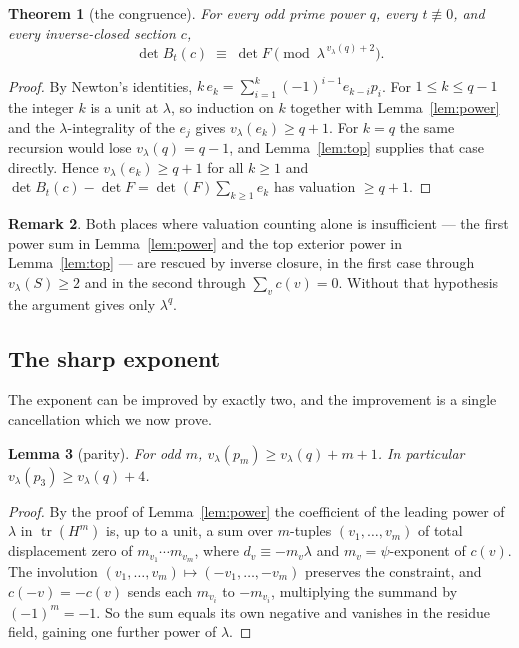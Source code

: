 \documentclass[11pt]{article}
\theoremstyle{plain}
\newtheorem{theorem}{Theorem}
\newtheorem{lemma}[theorem]{Lemma}
\theoremstyle{definition}
\newtheorem{remark}[theorem]{Remark}
\newcommand{\tr}{\operatorname{tr}}
\newcommand{\vlam}{v_\lambda}
\begin{document}
\begin{theorem}[the congruence]\label{thm:cong}
For every odd prime power $q$, every $t\not\equiv0$, and every inverse-closed
section $c$,
\[
\det B_t(c)\;\equiv\;\det F\pmod{\lambda^{\,\vlam(q)+2}} .
\]
\end{theorem}

\begin{proof}
By Newton's identities, $k\,e_k=\sum_{i=1}^{k}(-1)^{i-1}e_{k-i}p_i$. For
$1\le k\le q-1$ the integer $k$ is a unit at $\lambda$, so induction on $k$
together with Lemma~\ref{lem:power} and the $\lambda$-integrality of the
$e_j$ gives $\vlam(e_k)\ge q+1$. For $k=q$ the same recursion would lose
$\vlam(q)=q-1$, and Lemma~\ref{lem:top} supplies that case directly. Hence
$\vlam(e_k)\ge q+1$ for all $k\ge1$ and
$\det B_t(c)-\det F=\det(F)\sum_{k\ge1}e_k$ has valuation $\ge q+1$.
\end{proof}

\begin{remark}
Both places where valuation counting alone is insufficient --- the first power
sum in Lemma~\ref{lem:power} and the top exterior power in
Lemma~\ref{lem:top} --- are rescued by inverse closure, in the first case
through $\vlam(S)\ge2$ and in the second through $\sum_{v}c(v)=0$. Without
that hypothesis the argument gives only $\lambda^{q}$.
\end{remark}

\subsection{The sharp exponent}

The exponent can be improved by exactly two, and the improvement is a single
cancellation which we now prove.

\begin{lemma}[parity]\label{lem:parity}
For odd $m$, $\vlam(p_m)\ge\vlam(q)+m+1$. In particular
$\vlam(p_3)\ge\vlam(q)+4$.
\end{lemma}

\begin{proof}
By the proof of Lemma~\ref{lem:power} the coefficient of the leading power of
$\lambda$ in $\tr(H^m)$ is, up to a unit, a sum over $m$-tuples $(v_1,\dots,v_m)$
of total displacement zero of $m_{v_1}\cdots m_{v_m}$, where $d_v\equiv-m_v\lambda$
and $m_v=\psi$-exponent of $c(v)$. The involution
$(v_1,\dots,v_m)\mapsto(-v_1,\dots,-v_m)$ preserves the constraint, and
$c(-v)=-c(v)$ sends each $m_{v_i}$ to $-m_{v_i}$, multiplying the summand by
$(-1)^m=-1$. So the sum equals its own negative and vanishes in the residue
field, gaining one further power of $\lambda$.
\end{proof}
\end{document}
